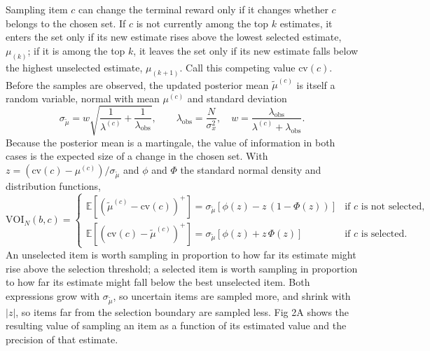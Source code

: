 \documentclass[10pt,letterpaper]{article}
\begin{document}
Sampling item \(c\) can change the terminal reward only if it changes
whether \(c\) belongs to the chosen set. If \(c\) is not currently among
the top \(k\) estimates, it enters the set only if its new estimate
rises above the lowest selected estimate, \(\mu_{(k)}\); if it is among
the top \(k\), it leaves the set only if its new estimate falls below
the highest unselected estimate, \(\mu_{(k+1)}\). Call this competing
value \(\text{cv}(c)\). Before the samples are observed, the updated
posterior mean \(\tilde{\mu}^{(c)}\) is itself a random variable, normal
with mean \(\mu^{(c)}\) and standard deviation \begin{equation}
\sigma_{\tilde{\mu}} = w \sqrt{\frac{1}{\lambda^{(c)}} + \frac{1}{\lambda_{\text{obs}}}}, \qquad \lambda_{\text{obs}} = \frac{N}{\sigma_x^2}, \quad w = \frac{\lambda_{\text{obs}}}{\lambda^{(c)} + \lambda_{\text{obs}}}. 
\end{equation} Because the posterior mean is a martingale, the value of
information in both cases is the expected size of a change in the chosen
set. With \(z = (\text{cv}(c) - \mu^{(c)}) / \sigma_{\tilde{\mu}}\) and
\(\phi\) and \(\Phi\) the standard normal density and distribution
functions, \begin{equation}
\text{VOI}_N(b, c) = \begin{cases} \mathbb{E}\!\left[(\tilde{\mu}^{(c)} - \text{cv}(c))^{+}\right] = \sigma_{\tilde{\mu}}\left[\phi(z) - z\,(1 - \Phi(z))\right] & \text{if } c \text{ is not selected,} \\[4pt] \mathbb{E}\!\left[(\text{cv}(c) - \tilde{\mu}^{(c)})^{+}\right] = \sigma_{\tilde{\mu}}\left[\phi(z) + z\,\Phi(z)\right] & \text{if } c \text{ is selected.} \end{cases} 
\end{equation} An unselected item is worth sampling in proportion to how
far its estimate might rise above the selection threshold; a selected
item is worth sampling in proportion to how far its estimate might fall
below the best unselected item. Both expressions grow with
\(\sigma_{\tilde{\mu}}\), so uncertain items are sampled more, and
shrink with \(|z|\), so items far from the selection boundary are
sampled less. Fig 2A shows the resulting value of sampling an item as a
function of its estimated value and the precision of that estimate.
\end{document}
